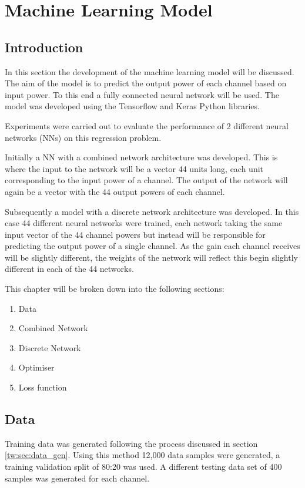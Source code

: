 


\newpage
\section{Machine Learning Model}\label{tw:ml_model}


\subsection{Introduction}
In this section the development of the machine learning model will be discussed. The aim of the model is to predict the output power of each channel based on input power. To this end a fully connected neural network will be used. The model was developed using the Tensorflow and Keras Python libraries.

Experiments were carried out to evaluate the performance of 2 different neural networks (NNs) on this regression problem.

Initially a NN with a combined network architecture was developed. This is where the input to the network will be a vector 44 units long, each unit corresponding to the input power of a channel. The output of the network will again be a vector with the 44 output powers of each channel.

Subsequently a model with a discrete network architecture was developed. In this case 44 different neural networks were trained, each network taking the same input vector of the 44 channel powers but instead will be responsible for predicting the output power of a single channel. As the gain each channel receives will be slightly different, the weights of the network will reflect this begin slightly different in each of the 44 networks.


This chapter will be broken down into the following sections:
\begin{enumerate}
    \item Data
    \item Combined Network
    \item Discrete Network
    \item Optimiser
    \item Loss function
\end{enumerate}

\subsection{Data}
\FloatBarrier
Training data was generated following the process discussed in section \ref{tw:sec:data_gen}. Using this method 12,000 data samples were generated, a training validation split of 80:20 was used. A different testing data set of 400 samples was generated for each channel. 

